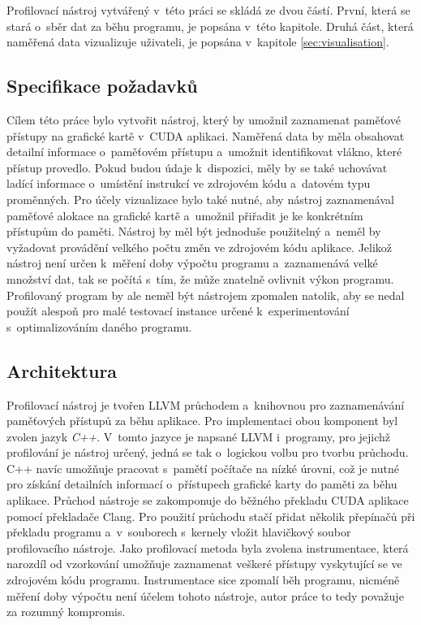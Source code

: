 Profilovací nástroj vytvářený v~této práci se skládá ze dvou částí. První, která se stará o~sběr dat za běhu programu, je popsána v~této kapitole. Druhá část, která naměřená data vizualizuje uživateli, je popsána v~kapitole \ref{sec:visualisation}.

\subsection{Specifikace požadavků}
Cílem této práce bylo vytvořit nástroj, který by umožnil zaznamenat paměťové přístupy na grafické kartě v~CUDA aplikaci. Naměřená data by měla obsahovat detailní informace o~paměťovém přístupu a~umožnit identifikovat vlákno, které přístup provedlo. Pokud budou údaje k~dispozici, měly by se také uchovávat ladící informace o~umístění instrukcí ve zdrojovém kódu a~datovém typu proměnných.
Pro účely vizualizace bylo také nutné, aby nástroj zaznamenával paměťové alokace na grafické kartě a~umožnil přiřadit je ke konkrétním přístupům do paměti.
Nástroj by měl být jednoduše použitelný a~neměl by vyžadovat provádění velkého počtu změn ve zdrojovém kódu aplikace. Jelikož nástroj není určen k~měření doby výpočtu programu a~zaznamenává velké množství dat, tak se počítá s~tím, že může znatelně ovlivnit výkon programu. Profilovaný program by ale neměl být nástrojem zpomalen natolik, aby se nedal použít alespoň pro malé testovací instance určené k~experimentování s~optimalizováním daného programu.

\subsection{Architektura}
Profilovací nástroj je tvořen LLVM průchodem a~knihovnou pro zaznamenávání paměťových přístupů za běhu aplikace. Pro implementaci obou komponent byl zvolen jazyk \emph{C++}. V~tomto jazyce je napsané LLVM i~programy, pro jejichž profilování je nástroj určený, jedná se tak o~logickou volbu pro tvorbu průchodu. C++ navíc umožňuje pracovat s~pamětí počítače na nízké úrovni, což je nutné pro získání detailních informací o~přístupech grafické karty do paměti za běhu aplikace.
Průchod nástroje se zakomponuje do běžného překladu CUDA aplikace pomocí překladače Clang. Pro použití průchodu stačí přidat několik přepínačů při překladu programu a~v~souborech s~kernely vložit hlavičkový soubor profilovacího nástroje. 
Jako profilovací metoda byla zvolena instrumentace, která narozdíl od vzorkování umožňuje zaznamenat veškeré přístupy vyskytující se ve zdrojovém kódu programu. Instrumentace sice zpomalí běh programu, nicméně měření doby výpočtu není účelem tohoto nástroje, autor práce to tedy považuje za rozumný kompromis.

